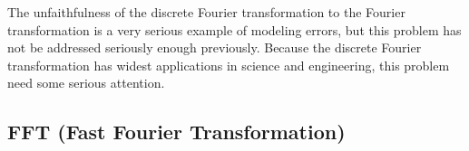 \documentclass[twoside]{article}
\numberwithin{equation}{section}
\begin{document}
The unfaithfulness of the discrete Fourier transformation to the Fourier transformation is a very serious example of modeling errors, but this problem has not be addressed seriously enough previously.
Because the discrete Fourier transformation has widest applications in science and engineering, this problem need some serious attention.


\subsection{FFT (Fast Fourier Transformation)}

\end{document}
